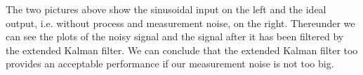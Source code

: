 The two pictures above show the sinusoidal input on the left and the ideal output, i.e. without process and measurement noise, on the right. Thereunder we can see the plots of the noisy signal and the signal after it has been filtered by the extended Kalman filter. We can conclude that the extended Kalman filter too provides an acceptable performance if our measurement noise is not too big.



